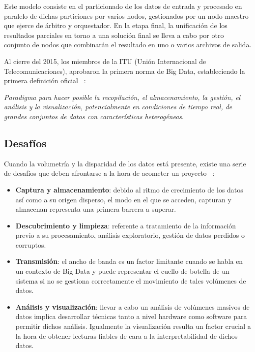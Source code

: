 Este modelo consiste en el particionado de los datos de entrada y procesado en
paralelo de dichas particiones por varios nodos, gestionados por un nodo maestro
que ejerce de árbitro y orquestador. En la etapa final, la
unificación de los resultados parciales en torno a una solución final se lleva a
cabo por otro conjunto de nodos que combinarán el resultado en uno o varios
archivos de salida.

Al cierre del 2015, los miembros de la ITU (Unión Internacional de
Telecomunicaciones), aprobaron la primera norma de Big Data, estableciendo la
primera definición oficial ~\cite{ITU}:

\textit{Paradigma para hacer posible la recopilación, el almacenamiento, la
  gestión, el análisis y la visualización, potencialmente en condiciones de
  tiempo real, de grandes conjuntos de datos con características heterogéneas}.

\subsection{Desafíos}

Cuando la volumetría y la disparidad de los datos está presente, existe una
serie de desafíos que deben afrontarse a la hora de acometer un proyecto ~\cite{DBLP:journals/isci/ChenZ14a}:

\begin{itemize}
\item \textbf{Captura y almacenamiento}: debido al ritmo de crecimiento de los
  datos así como a su origen disperso, el modo en el que se acceden, capturan y
  almacenan representa una primera barrera a superar. 
\item \textbf{Descubrimiento y limpieza}: referente a tratamiento de la información previo a
  su procesamiento, análisis exploratorio, gestión de datos perdidos o
  corruptos. 
\item \textbf{Transmisión}: el ancho de banda es un factor limitante cuando se
  habla en un contexto de Big Data y puede representar el cuello de botella de
  un sistema si no se gestiona correctamente el movimiento de tales volúmenes de
  datos.
  
\item \textbf{Análisis y visualización}: llevar a cabo un análisis de volúmenes
  masivos de datos implica desarrollar técnicas tanto a nivel hardware como
  software para permitir dichos análisis. Igualmente la visualización resulta un
  factor crucial a la hora de obtener lecturas fiables de cara a la
  interpretabilidad de dichos datos.
  
\end{itemize}


